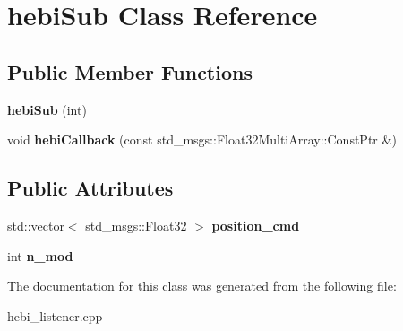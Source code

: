 \hypertarget{classhebiSub}{}\section{hebi\+Sub Class Reference}
\label{classhebiSub}
\subsection*{Public Member Functions}
\begin{DoxyCompactItemize}
\item 
{\bfseries hebi\+Sub} (int)\hypertarget{classhebiSub_a4318a55cd9c3d04e707d4f967ce3fa8b}{}\label{classhebiSub_a4318a55cd9c3d04e707d4f967ce3fa8b}

\item 
void {\bfseries hebi\+Callback} (const std\+\_\+msgs\+::\+Float32\+Multi\+Array\+::\+Const\+Ptr \&)\hypertarget{classhebiSub_a138b3fb698f64019f9066b6e22793cc4}{}\label{classhebiSub_a138b3fb698f64019f9066b6e22793cc4}

\end{DoxyCompactItemize}
\subsection*{Public Attributes}
\begin{DoxyCompactItemize}
\item 
std\+::vector$<$ std\+\_\+msgs\+::\+Float32 $>$ {\bfseries position\+\_\+cmd}\hypertarget{classhebiSub_ab121e7d471d3a847d24b319eadca516b}{}\label{classhebiSub_ab121e7d471d3a847d24b319eadca516b}

\item 
int {\bfseries n\+\_\+mod}\hypertarget{classhebiSub_add86ca7606f19981d627f881103ba6bd}{}\label{classhebiSub_add86ca7606f19981d627f881103ba6bd}

\end{DoxyCompactItemize}


The documentation for this class was generated from the following file\+:\begin{DoxyCompactItemize}
\item 
hebi\+\_\+listener.\+cpp\end{DoxyCompactItemize}
